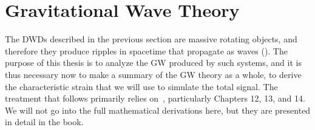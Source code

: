 \section{Gravitational Wave Theory}
{The DWDs described in the previous section are massive rotating objects, and therefore they produce ripples in spacetime that propagate as waves (\cite{Einstein_1918}).
The purpose of this thesis is to analyze the GW produced by such systems, and it is thus necessary now to make a summary of the GW theory as a whole, to derive the characteristic strain that we will use to simulate the total signal.}
The treatment that follows primarily relies on~\cite{ferrari2020general}, particularly Chapters 12, 13, and 14.
We will not go into the full mathematical derivations here, but they are presented in detail in the book.

